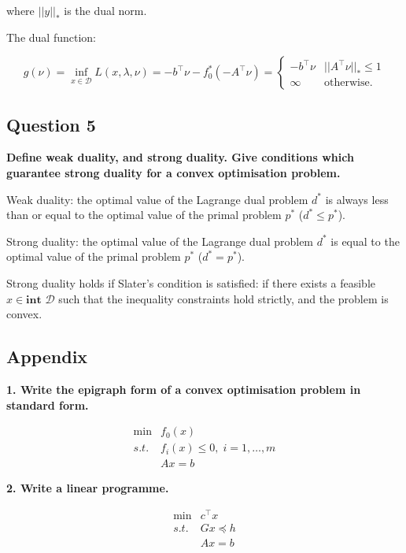 where $||y||_*$ is the dual norm.

The dual function:

$$
g(\nu) = \inf_{x\in\mathcal{D}}  L(x,\lambda, \nu) = -b^\top \nu - f_0^*(-A^\top \nu) = \left\{\begin{array}{ll} -b^\top \nu & ||A^\top \nu||_*\le 1 \\ \infty & \text{otherwise.}  \end{array} \right.
$$


\subsection*{Question 5}
\textbf{Define weak duality, and strong duality. Give conditions which guarantee strong duality for a convex optimisation problem.}

Weak duality: the optimal value of the Lagrange dual problem $d^*$ is always less than or equal to the optimal value of the primal problem $p^*$ ($d^* \leq p^*$).

Strong duality: the optimal value of the Lagrange dual problem $d^*$ is equal to the optimal value of the primal problem $p^*$ ($d^* = p^*$). 

Strong duality holds if Slater's condition is satisfied: if there exists a feasible $x \in \textbf{int }\mathcal{D}$ such that the inequality constraints hold strictly, and the problem is convex. 




\subsection*{Appendix}

\noindent\textbf{1. \; Write the epigraph form of a convex optimisation problem in standard form.}

$$
\begin{array}{ll}
\min & f_0(x)\\
s.t. & f_i(x) \le 0, \; i = 1,\dots,m\\
& Ax = b
\end{array}
$$

\noindent\textbf{2. \; Write a linear programme.}

$$
\begin{array}{ll}
\min & c^\top x\\
s.t. & G x \preccurlyeq h\\
& Ax = b
\end{array}
$$

